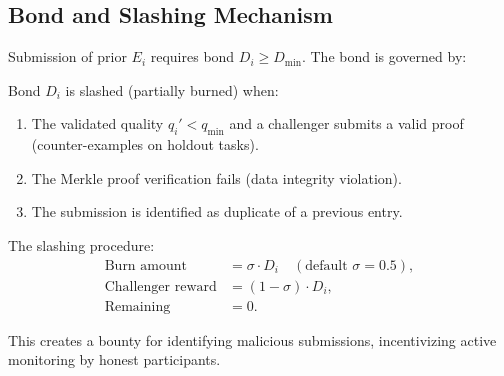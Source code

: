 \subsection{Bond and Slashing Mechanism}

Submission of prior $E_i$ requires bond $D_i \geq D_{\min}$. The bond is
governed by:

\begin{definition}
Bond $D_i$ is slashed (partially burned) when:
\begin{enumerate}[leftmargin=1.5em]
    \item The validated quality $q_i' < q_{\min}$ and a challenger submits a
          valid proof (counter-examples on holdout tasks).
    \item The Merkle proof verification fails (data integrity violation).
    \item The submission is identified as duplicate of a previous entry.
\end{enumerate}
\end{definition}

The slashing procedure:
\begin{align}
    \text{Burn amount} &= \sigma \cdot D_i \quad (\text{default } \sigma = 0.5), \\
    \text{Challenger reward} &= (1 - \sigma) \cdot D_i, \\
    \text{Remaining} &= 0.
\end{align}

This creates a bounty for identifying malicious submissions, incentivizing
active monitoring by honest participants.

